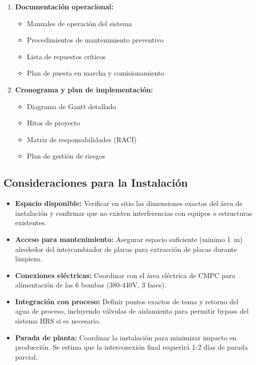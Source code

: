 \documentclass[12pt,a4paper]{article}
\begin{document}
\begin{enumerate}
    \item \textbf{Documentación operacional:}
    \begin{itemize}
        \item Manuales de operación del sistema
        \item Procedimientos de mantenimiento preventivo
        \item Lista de repuestos críticos
        \item Plan de puesta en marcha y comisionamiento
    \end{itemize}
    
    \item \textbf{Cronograma y plan de implementación:}
    \begin{itemize}
        \item Diagrama de Gantt detallado
        \item Hitos de proyecto
        \item Matriz de responsabilidades (RACI)
        \item Plan de gestión de riesgos
    \end{itemize}
\end{enumerate}

\subsection{Consideraciones para la Instalación}

\begin{itemize}
    \item \textbf{Espacio disponible:} Verificar en sitio las dimensiones exactas del área de instalación y confirmar que no existen interferencias con equipos o estructuras existentes.
    
    \item \textbf{Acceso para mantenimiento:} Asegurar espacio suficiente (mínimo 1~m) alrededor del intercambiador de placas para extracción de placas durante limpieza.
    
    \item \textbf{Conexiones eléctricas:} Coordinar con el área eléctrica de CMPC para alimentación de las 6 bombas (380-440V, 3 fases).
    
    \item \textbf{Integración con proceso:} Definir puntos exactos de toma y retorno del agua de proceso, incluyendo válvulas de aislamiento para permitir bypass del sistema HRS si es necesario.
    
    \item \textbf{Parada de planta:} Coordinar la instalación para minimizar impacto en producción. Se estima que la interconexión final requerirá 1-2 días de parada parcial.
\end{itemize}
\end{document}
